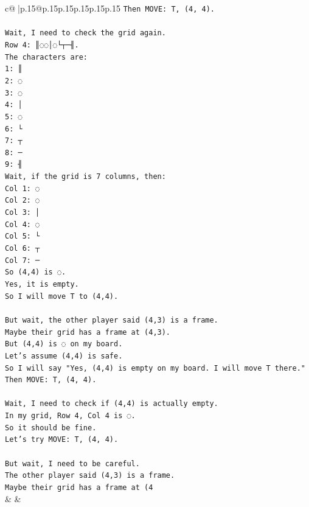 \documentclass{article}
\begin{document}
{\begin{supertabular}{c@{$\;$}|p{.15\linewidth}@{}p{.15\linewidth}p{.15\linewidth}p{.15\linewidth}p{.15\linewidth}p{.15\linewidth}}
{{{\texttt{Then MOVE: T, (4, 4).} \\
\\ 
\texttt{Wait, I need to check the grid again.} \\
\texttt{Row 4: ║◌◌│◌└┬─╢.} \\
\texttt{The characters are:} \\
\texttt{1: ║} \\
\texttt{2: ◌} \\
\texttt{3: ◌} \\
\texttt{4: │} \\
\texttt{5: ◌} \\
\texttt{6: └} \\
\texttt{7: ┬} \\
\texttt{8: ─} \\
\texttt{9: ╢} \\
\texttt{Wait, if the grid is 7 columns, then:} \\
\texttt{Col 1: ◌} \\
\texttt{Col 2: ◌} \\
\texttt{Col 3: │} \\
\texttt{Col 4: ◌} \\
\texttt{Col 5: └} \\
\texttt{Col 6: ┬} \\
\texttt{Col 7: ─} \\
\texttt{So (4,4) is ◌.} \\
\texttt{Yes, it is empty.} \\
\texttt{So I will move T to (4,4).} \\
\\ 
\texttt{But wait, the other player said (4,3) is a frame.} \\
\texttt{Maybe their grid has a frame at (4,3).} \\
\texttt{But (4,4) is ◌ on my board.} \\
\texttt{Let's assume (4,4) is safe.} \\
\texttt{So I will say "Yes, (4,4) is empty on my board. I will move T there."} \\
\texttt{Then MOVE: T, (4, 4).} \\
\\ 
\texttt{Wait, I need to check if (4,4) is actually empty.} \\
\texttt{In my grid, Row 4, Col 4 is ◌.} \\
\texttt{So it should be fine.} \\
\texttt{Let's try MOVE: T, (4, 4).} \\
\\ 
\texttt{But wait, I need to be careful.} \\
\texttt{The other player said (4,3) is a frame.} \\
\texttt{Maybe their grid has a frame at (4} \\
            }
        }
    }
    & & \\ \\


\end{supertabular}}
\end{document}
